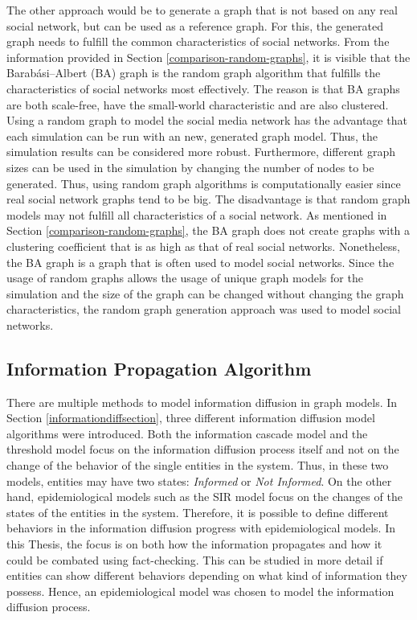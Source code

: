 The other approach would be to generate a graph that is not based
on any real social network, but can be used as a reference graph.
For this, the generated graph needs to fulfill the common
characteristics of social networks.
From the information provided in Section \ref{comparison-random-graphs}, 
it is visible that the Barabási–Albert (BA) graph is the random graph 
algorithm that fulfills the characteristics of social networks most effectively.
The reason is that BA graphs are both scale-free, have the small-world
characteristic and are also clustered.
Using a random graph to model the social media network has the advantage
that each simulation can be run with an new, generated graph model. 
Thus, the simulation results can be considered more robust. 
Furthermore, different graph sizes can be 
used in the simulation by changing the number of nodes to be generated.
Thus, using random graph algorithms is computationally easier since 
real social network graphs tend to be big.
The disadvantage is that random graph models may not fulfill
all characteristics of a social network. As mentioned in 
Section \ref{comparison-random-graphs}, the BA graph
does not create graphs with a clustering coefficient that is as 
high as that of real social networks. Nonetheless, the BA graph is
a graph that is often used to model social networks.
Since the usage of random graphs allows the usage
of unique graph models for the simulation and the size of the 
graph can be changed without changing the graph characteristics, 
the random graph generation approach was used to model social networks.

\subsection{Information Propagation Algorithm}
\label{modelinformationdiffusion}

There are multiple methods to model information diffusion in graph models.
In Section \ref{informationdiffsection}, three different information diffusion
model algorithms were introduced.
Both the information cascade model and the threshold model focus on the 
information diffusion process itself and not on the change of the behavior
of the single entities in the system. Thus, in these two models,
entities may have two states: 
\textit{Informed} or \textit{Not Informed}.
On the other hand, epidemiological models such as the SIR model
focus on the changes of the states of the entities in the system.
Therefore, it is possible to define different behaviors in the
information diffusion progress with epidemiological models. 
In this Thesis, the focus is on both how the information
propagates and how it could be combated using fact-checking.
This can be studied in more detail if entities can 
show different behaviors depending on what kind of information
they possess. Hence, an epidemiological model was chosen 
to model the information diffusion process.

